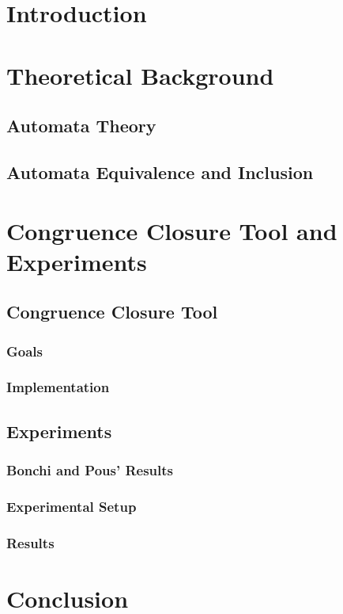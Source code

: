 
\chapter{Introduction}

\chapter{Theoretical Background}

\section{Automata Theory}


\section{Automata Equivalence and Inclusion}


\chapter{Congruence Closure Tool and Experiments}

\section{Congruence Closure Tool}

\subsection{Goals}

\subsection{Implementation}

\section{Experiments}

\subsection{Bonchi and Pous' Results}

\subsection{Experimental Setup}

\subsection{Results}

\chapter{Conclusion}
